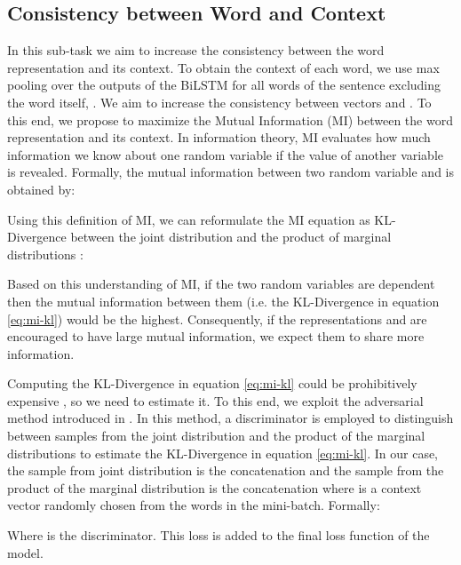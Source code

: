 \documentclass[11pt,a4paper]{article}
\begin{document}
\subsection{Consistency between Word and Context}
In this sub-task we aim to increase the consistency between the word representation and its context. To obtain the context of each word, we use max pooling over the outputs of the BiLSTM for all words of the sentence excluding the word itself, . We aim to increase the consistency between vectors  and . To this end, we propose to maximize the Mutual Information (MI) between the word representation and its context. In information theory, MI evaluates how much information we know about one random variable if the value of another variable is revealed. Formally, the mutual information between two random variable  and  is obtained by:



Using this definition of MI, we can reformulate the MI equation as KL-Divergence between the joint distribution  and the product of marginal distributions :



 Based on this understanding of MI, if the two random variables are dependent then the mutual information between them (i.e. the KL-Divergence in equation \ref{eq:mi-kl}) would be the highest. Consequently, if the representations  and  are encouraged to have large mutual information, we expect them to share more information.
 
 Computing the KL-Divergence in equation \ref{eq:mi-kl} could be prohibitively expensive \cite{belghazi:18}, so we need to estimate it. To this end, we exploit the adversarial method introduced in \cite{hjelm:19}. In this method, a discriminator is employed to distinguish between samples from the joint distribution and the product of the marginal distributions to estimate the KL-Divergence in equation \ref{eq:mi-kl}. In our case, the sample from joint distribution is the concatenation  and the sample from the product of the marginal distribution is the concatenation  where  is a context vector randomly chosen from the words in the mini-batch. Formally:
 
 
Where  is the discriminator. This loss is added to the final loss function of the model.
\end{document}
